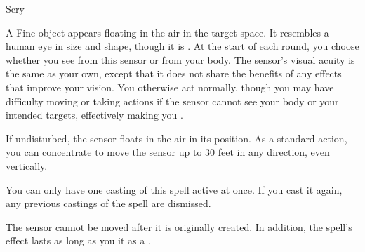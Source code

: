 \newpage
\begin{spellsection}{Scry}

\begin{spellheader}
\end{spellheader}

\begin{spellcontent}

\begin{spelltargetinginfo}




\end{spelltargetinginfo}


\begin{spelleffects}



\spelleffect
A Fine object appears floating in the air in the target space.
It resembles a human eye in size and shape, though it is .
At the start of each round, you choose whether you see from this sensor or from your body.
The sensor's visual acuity is the same as your own, except that it does not share the benefits of any  effects that improve your vision.
You otherwise act normally, though you may have difficulty moving or taking actions if the sensor cannot see your body or your intended targets, effectively making you \blinded.

If undisturbed, the sensor floats in the air in its position.
As a standard action, you can concentrate to move the sensor up to 30 feet in any direction, even vertically.

You can only have one casting of this spell active at once.
If you cast it again, any previous castings of the spell are dismissed.








\end{spelleffects}

\end{spellcontent}
\begin{spellfooter}


\end{spellfooter}
\begin{spellsubcontent}


\begin{spellcantrip}

The sensor cannot be moved after it is originally created.
In addition, the spell's effect lasts as long as you  it as a .

\end{spellcantrip}


\end{spellsubcontent}
\end{spellsection}


